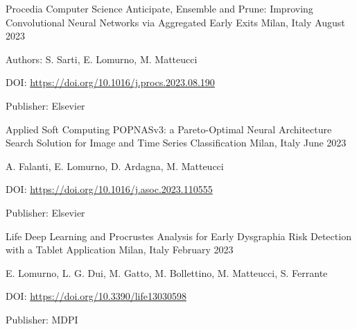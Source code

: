 \begin{cventries}
    \vspace{2mm}
    \cventry
        {Procedia Computer Science}
        {Anticipate, Ensemble and Prune: Improving Convolutional Neural Networks via Aggregated Early Exits}
        {Milan, Italy}
        {August 2023}
        {
        \begin{cvitems}
            \item {Authors: S. Sarti, E. Lomurno, M. Matteucci}
            \item {DOI: \url{https://doi.org/10.1016/j.procs.2023.08.190}}
            \item {Publisher: Elsevier}
        \end{cvitems}
        }

    \vspace{2mm}
    \cventry
        {Applied Soft Computing} %
        {POPNASv3: a Pareto-Optimal Neural Architecture Search Solution for Image and Time Series Classification}
        {Milan, Italy}
        {June 2023}
        {
        \begin{cvitems}
            \item {A. Falanti, E. Lomurno, D. Ardagna, M. Matteucci}
            \item {DOI: \url{https://doi.org/10.1016/j.asoc.2023.110555}}
            \item {Publisher: Elsevier}
        \end{cvitems}
        }

    \vspace{2mm}
    \cventry
        {Life} %
        {Deep Learning and Procrustes Analysis for Early Dysgraphia Risk Detection with a Tablet Application}
        {Milan, Italy}
        {February 2023}
        {
        \begin{cvitems}
            \item {E. Lomurno, L. G. Dui, M. Gatto, M. Bollettino, M. Matteucci, S. Ferrante}
            \item {DOI: \url{https://doi.org/10.3390/life13030598}}
            \item {Publisher: MDPI}
        \end{cvitems}
        }


\end{cventries}
